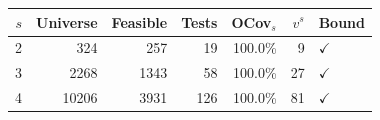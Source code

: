 \begin{tabular}{rrrrrrl}
\toprule
$s$ & Universe & Feasible & Tests & OCov$_s$ & $v^s$ & Bound \\
\midrule
2 & 324 & 257 & 19 & 100.0\% & 9 & $\checkmark$ \\
3 & 2268 & 1343 & 58 & 100.0\% & 27 & $\checkmark$ \\
4 & 10206 & 3931 & 126 & 100.0\% & 81 & $\checkmark$ \\
\bottomrule
\end{tabular}